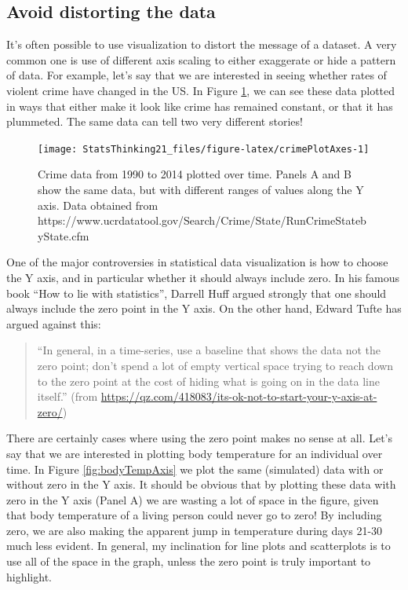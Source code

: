 \documentclass[
  12pt,
]{book}
\begin{document}
\hypertarget{avoid-distorting-the-data}{%
\subsection{Avoid distorting the data}\label{avoid-distorting-the-data}}

It's often possible to use visualization to distort the message of a dataset. A very common one is use of different axis scaling to either exaggerate or hide a pattern of data. For example, let's say that we are interested in seeing whether rates of violent crime have changed in the US. In Figure \ref{fig:crimePlotAxes}, we can see these data plotted in ways that either make it look like crime has remained constant, or that it has plummeted. The same data can tell two very different stories!

\begin{figure}
\texttt{[image: StatsThinking21\_files/figure-latex/crimePlotAxes-1]} \caption{Crime data from 1990 to 2014 plotted over time.  Panels A and B show the same data, but with different ranges of values along the Y axis. Data obtained from https://www.ucrdatatool.gov/Search/Crime/State/RunCrimeStatebyState.cfm}\label{fig:crimePlotAxes}
\end{figure}

One of the major controversies in statistical data visualization is how to choose the Y axis, and in particular whether it should always include zero. In his famous book ``How to lie with statistics'', Darrell Huff argued strongly that one should always include the zero point in the Y axis. On the other hand, Edward Tufte has argued against this:

\begin{quote}
``In general, in a time-series, use a baseline that shows the data not the zero point; don't spend a lot of empty vertical space trying to reach down to the zero point at the cost of hiding what is going on in the data line itself.'' (from \url{https://qz.com/418083/its-ok-not-to-start-your-y-axis-at-zero/})
\end{quote}

There are certainly cases where using the zero point makes no sense at all. Let's say that we are interested in plotting body temperature for an individual over time. In Figure \ref{fig:bodyTempAxis} we plot the same (simulated) data with or without zero in the Y axis. It should be obvious that by plotting these data with zero in the Y axis (Panel A) we are wasting a lot of space in the figure, given that body temperature of a living person could never go to zero! By including zero, we are also making the apparent jump in temperature during days 21-30 much less evident. In general, my inclination for line plots and scatterplots is to use all of the space in the graph, unless the zero point is truly important to highlight.
\end{document}
